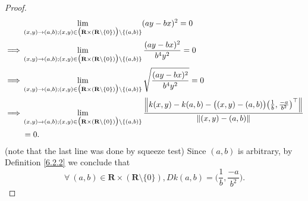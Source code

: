 \begin{proof}
    \begin{align*}
                 & \lim_{(x, y) \to (a, b) ; (x, y) \in \big(\mathbf{R} \times (\mathbf{R} \setminus \{0\})\big) \setminus \{(a, b)\}} (ay - bx)^2 = 0                                                                                                                  \\
        \implies & \lim_{(x, y) \to (a, b) ; (x, y) \in \big(\mathbf{R} \times (\mathbf{R} \setminus \{0\})\big) \setminus \{(a, b)\}} \frac{(ay - bx)^2}{b^4 y^2} = 0                                                                                                  \\
        \implies & \lim_{(x, y) \to (a, b) ; (x, y) \in \big(\mathbf{R} \times (\mathbf{R} \setminus \{0\})\big) \setminus \{(a, b)\}} \sqrt{\frac{(ay - bx)^2}{b^4 y^2}} = 0                                                                                           \\
        \implies & \lim_{(x, y) \to (a, b) ; (x, y) \in \big(\mathbf{R} \times (\mathbf{R} \setminus \{0\})\big) \setminus \{(a, b)\}} \frac{\norm*{k(x, y) - k(a, b) - \big((x, y) - (a, b)\big) \big(\frac{1}{b}, \frac{-a}{b^2}\big)^\top}}{\norm*{(x, y) - (a, b)}} \\
                 & = 0.
    \end{align*}
    (note that the last line was done by squeeze test)
    Since \((a, b)\) is arbitrary, by Definition \ref{6.2.2} we conclude that
    \[
        \forall\ (a, b) \in \mathbf{R} \times (\mathbf{R} \setminus \{0\}), D k(a, b) = \bigg(\frac{1}{b}, \frac{-a}{b^2}\bigg).
    \]


\end{proof}
